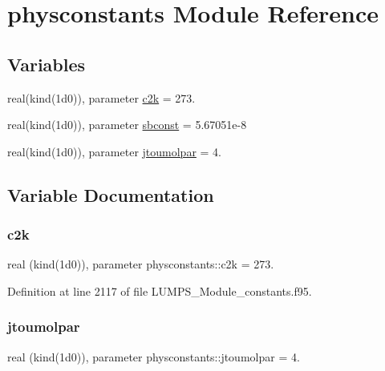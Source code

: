 \hypertarget{namespacephysconstants}{}\section{physconstants Module Reference}
\label{namespacephysconstants}
\subsection*{Variables}
\begin{DoxyCompactItemize}
\item 
real(kind(1d0)), parameter \hyperlink{namespacephysconstants_a3440be0c8f808e005a3f8400ebe8ea07}{c2k} = 273.
\item 
real(kind(1d0)), parameter \hyperlink{namespacephysconstants_ace6c4e6b3043559bb2ee21b5f4c2cc8e}{sbconst} = 5.\+67051e-\/8
\item 
real(kind(1d0)), parameter \hyperlink{namespacephysconstants_a73315ec4406d89b720497281c9353eb2}{jtoumolpar} = 4.
\end{DoxyCompactItemize}


\subsection{Variable Documentation}
\mbox{\label{namespacephysconstants_a3440be0c8f808e005a3f8400ebe8ea07}} 
\subsubsection{\texorpdfstring{c2k}{c2k}}
{\footnotesize\ttfamily real (kind(1d0)), parameter physconstants\+::c2k = 273.}



Definition at line 2117 of file L\+U\+M\+P\+S\+\_\+\+Module\+\_\+constants.\+f95.

\mbox{\label{namespacephysconstants_a73315ec4406d89b720497281c9353eb2}} 
\subsubsection{\texorpdfstring{jtoumolpar}{jtoumolpar}}
{\footnotesize\ttfamily real (kind(1d0)), parameter physconstants\+::jtoumolpar = 4.}



